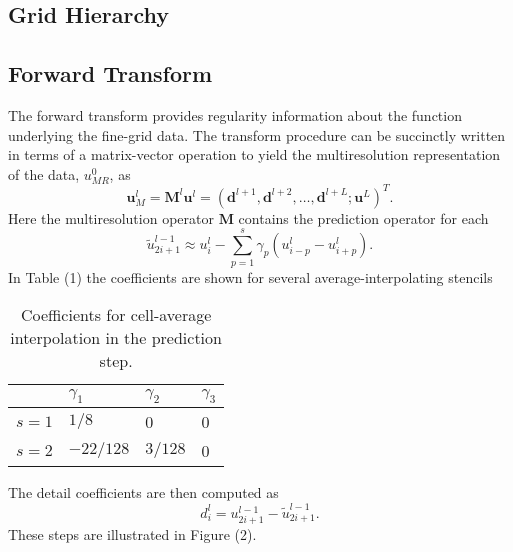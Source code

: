 \documentclass[12pt,letterpaper]{article}
\begin{document}
    \subsection*{Grid Hierarchy}


    \subsection*{Forward Transform}

        The forward transform provides regularity information about the function
        underlying the fine-grid data. The transform procedure can be succinctly
        written in terms of a matrix-vector operation to yield the
        multiresolution representation of the data, $u_{MR}^{0}$, as
        \begin{equation}
            \bm{u}_{M}^{l} = \bm{M}^{l} \bm{u}^{l} = \left( \bm{d}^{l+1}, \bm{d}^{l+2},
            \dots, \bm{d}^{l+L}; \bm{u}^{L} \right)^{T}.
        \end{equation}
        Here the multiresolution operator $\bm{M}$ contains the prediction
        operator for each
        \begin{equation}
            \tilde{u}_{2i+1}^{l-1} \approx u_{i}^{l} - \sum_{p=1}^{s}
            \gamma_{p} \left( u^{l}_{i-p} - u^{l}_{i+p} \right).
        \end{equation}
        In Table (1) the coefficients are shown for several average-interpolating stencils
        \begin{table}
            \centering
            \begin{tabular}{|l|l|l|l|}
            \hline
                & $\gamma_{1}$ & $\gamma_{2}$ & $\gamma_{3}$ \\ \hline
                $s=1$ & $1/8$ & 0 & 0 \\ \hline
                $s=2$ & $-22/128$ & $3/128$ & 0 \\ \hline
            \end{tabular}
            \caption{Coefficients for cell-average interpolation in the prediction step.}
        \end{table}
        The detail coefficients are then computed as
        \begin{equation}
            d^{l}_{i} = u^{l-1}_{2i+1} - \tilde{u}^{l-1}_{2i+1}.
        \end{equation}
        These steps are illustrated in Figure (2).
\end{document}
